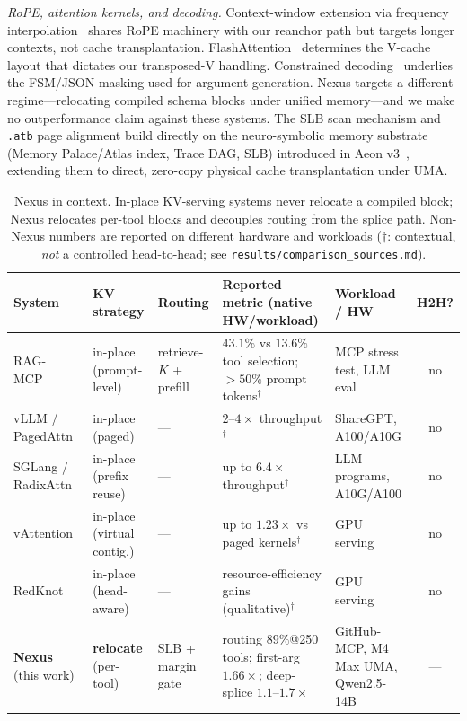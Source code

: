 \documentclass[10pt,conference]{IEEEtran}
\newcommand{\code}[1]{\texttt{\small #1}}
\begin{document}
\emph{RoPE, attention kernels, and decoding.} Context-window extension via frequency
interpolation~\cite{peng2023yarn} shares RoPE machinery with our reanchor path but targets longer
contexts, not cache transplantation. FlashAttention~\cite{dao2022flashattention,dao2023flashattention2}
determines the V-cache layout that dictates our transposed-V handling. Constrained
decoding~\cite{willard2023outlines,beurer2023lmql,guidance2023} underlies the FSM/JSON masking used
for argument generation. Nexus targets a different regime---relocating compiled schema blocks under
unified memory---and we make no outperformance claim against these systems. The SLB scan mechanism and \code{.atb} page alignment build directly on the neuro-symbolic memory substrate (Memory Palace/Atlas index, Trace DAG, SLB) introduced in Aeon v3~\cite{arslan2026aeon}, extending them to direct, zero-copy physical cache transplantation under UMA.

\begin{table}[t]
\centering
\caption{Nexus in context. In-place KV-serving systems never relocate a compiled block; Nexus
relocates per-tool blocks and decouples routing from the splice path. Non-Nexus numbers are
reported on different hardware and workloads ($\dagger$: contextual, \emph{not} a controlled
head-to-head; see \code{results/comparison\_sources.md}).}
\label{tab:comparison}
\scriptsize
\begin{tabular}{@{}l l l p{4.5cm} p{3.3cm} c@{}}
\toprule
System & KV strategy & Routing & Reported metric (native HW/workload) & Workload / HW & H2H? \\
\midrule
RAG-MCP~\cite{ragmcp2025}                  & in-place (prompt-level)      & retrieve-$K$ + prefill & $43.1\%$ vs $13.6\%$ tool selection; ${>}50\%$ prompt tokens$^\dagger$ & MCP stress test, LLM eval & no \\
vLLM / PagedAttn~\cite{kwon2023vllm}       & in-place (paged)             & ---                    & $2\text{--}4\times$ throughput$^\dagger$                   & ShareGPT, A100/A10G       & no \\
SGLang / RadixAttn~\cite{zheng2024sglang}  & in-place (prefix reuse)      & ---                    & up to $6.4\times$ throughput$^\dagger$                     & LLM programs, A10G/A100   & no \\
vAttention~\cite{vattention2025}           & in-place (virtual contig.)   & ---                    & up to $1.23\times$ vs paged kernels$^\dagger$              & GPU serving               & no \\
RedKnot~\cite{redknot2026}                 & in-place (head-aware)        & ---                    & resource-efficiency gains (qualitative)$^\dagger$          & GPU serving               & no \\
\midrule
\textbf{Nexus} (this work)                 & \textbf{relocate} (per-tool) & SLB + margin gate      & routing $89\%$@250 tools; first-arg $1.66\times$; deep-splice $1.1\text{--}1.7\times$ & GitHub-MCP, M4 Max UMA, Qwen2.5-14B & --- \\
\bottomrule
\end{tabular}
\end{table}
\end{document}
